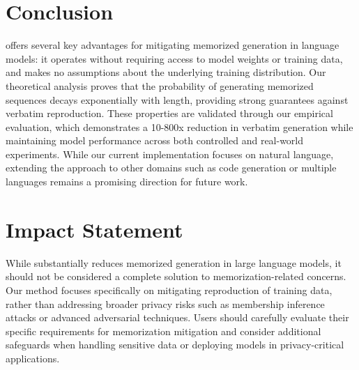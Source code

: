 \section{Conclusion}
\sys offers several key advantages for mitigating memorized generation in language models: it operates without requiring access to model weights or training data, and makes no assumptions about the underlying training distribution. Our theoretical analysis proves that the probability of generating memorized sequences decays exponentially with length, providing strong guarantees against verbatim reproduction. These properties are validated through our empirical evaluation, which demonstrates a 10-800x reduction in verbatim generation while maintaining model performance across both controlled and real-world experiments. While our current implementation focuses on natural language, extending the approach to other domains such as code generation or multiple languages remains a promising direction for future work.

\section*{Impact Statement}
While \sys substantially reduces memorized generation in large language models, it should not be considered a complete solution to memorization-related concerns. Our method focuses specifically on mitigating reproduction of training data, rather than addressing broader privacy risks such as membership inference attacks or advanced adversarial techniques. Users should carefully evaluate their specific requirements for memorization mitigation and consider additional safeguards when handling sensitive data or deploying models in privacy-critical applications.

